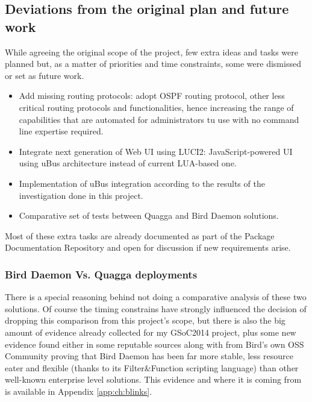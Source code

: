 \subsection{Deviations from the original plan and future work}
While agreeing the original scope of the project, few extra ideas and tasks were planned but, as a matter of priorities and time constraints, some were dismissed or set as future work.

\begin{itemize}
    \item Add missing routing protocols: adopt OSPF routing protocol, other less critical routing protocols and functionalities, hence increasing the range of capabilities that are automated for administrators tu use  with no command line expertise required.
    \item Integrate next generation of Web UI using LUCI2: JavaScript-powered UI using uBus architecture instead of current LUA-based one.
    \item Implementation of uBus integration according to the results of the investigation done in this project.
    \item Comparative set of tests between Quagga and Bird Daemon solutions.
\end{itemize}

Most of these extra tasks are already documented as part of the Package Documentation Repository \cite{docng} and open for discussion if new requirements arise.

\subsubsection{Bird Daemon Vs. Quagga deployments}
There is a special reasoning behind not doing a comparative analysis of these two solutions. Of course the timing constrains have strongly influenced the decision of dropping this comparison from this project's scope, but there is also the big amount of evidence already collected for my GSoC2014 project, plus some new evidence found either in some reputable sources along with from Bird's own OSS Community proving that Bird Daemon has been far more stable, less resource eater and flexible (thanks to its Filter\&Function scripting language) than other well-known enterprise level solutions. This evidence and where it is coming from is available in Appendix \ref{app:ch:blinks}.


